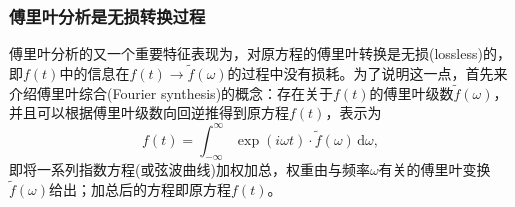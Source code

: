 \subsubsection{傅里叶分析是无损转换过程}
\label{sec:fourier-lossless}
傅里叶分析的又一个重要特征表现为，对原方程的傅里叶转换是无损(lossless)的，即$f(t)$中的信息在$f(t) \rightarrow \tilde{f}(\omega)$的过程中没有损耗。为了说明这一点，首先来介绍傅里叶综合(Fourier synthesis)的概念：存在关于$f(t)$的傅里叶级数$\tilde{f}(\omega)$，并且可以根据傅里叶级数向回逆推得到原方程$f(t)$，表示为
\begin{equation}
  \label{eq:fourier-series-synthesis}
  f(t) = \int_{-\infty}^{\infty} \exp \left( i \omega t \right) \cdot \tilde{f}(\omega) \, \mathrm{d} \omega,
\end{equation}
即将一系列指数方程(或弦波曲线)加权加总，权重由与频率$\omega$有关的傅里叶变换$\tilde{f}(\omega)$给出；加总后的方程即原方程$f(t)$。


